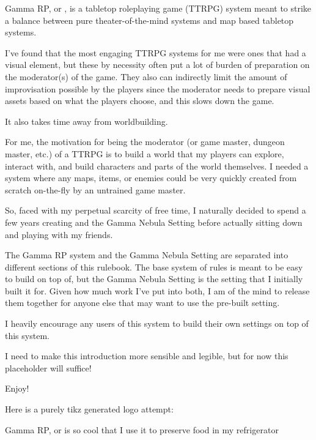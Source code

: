 
Gamma RP, or \GammaRP{}, is a tabletop roleplaying game (TTRPG) system meant to strike a balance between pure theater-of-the-mind systems and map based tabletop systems.

I've found that the most engaging TTRPG systems for me were ones that had a visual element, but these by necessity often put a lot of burden of preparation on the moderator(s) of the game. They also can indirectly limit the amount of improvisation possible by the players since the moderator needs to prepare visual assets based on what the players choose, and this slows down the game.

It also takes time away from worldbuilding.

For me, the motivation for being the moderator (or game master, dungeon master, etc.) of a TTRPG is to build a world that my players can explore, interact with, and build characters and parts of the world themselves. I needed a system where any maps, items, or enemies could be very quickly created from scratch on-the-fly by an untrained game master.

So, faced with my perpetual scarcity of free time, I naturally decided to spend a few years creating \GammaRP{} and the Gamma Nebula Setting before actually sitting down and playing with my friends.

The Gamma RP system and the Gamma Nebula Setting are separated into different sections of this rulebook. The base system of rules is meant to be easy to build on top of, but the Gamma Nebula Setting is the setting that I initially built it for. Given how much work I've put into both, I am of the mind to release them together for anyone else that may want to use the pre-built setting.

I heavily encourage any users of this system to build their own settings on top of this system.

I need to make this introduction more sensible and legible, but for now this placeholder will suffice!

Enjoy!

Here is a purely tikz generated logo attempt:

Gamma RP, or \GammaDodec{\GammaRP{}} is so cool that I use it to preserve food in my refrigerator